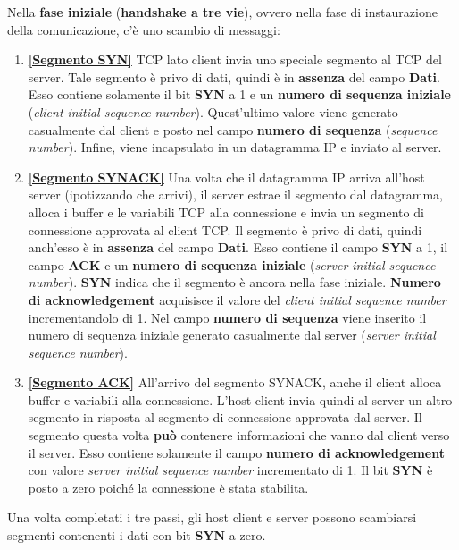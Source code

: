 \documentclass[a4paper]{article}
\begin{document}
	\noindent
	Nella \textcolor{Red3}{\textbf{fase iniziale}} (\textbf{handshake a tre vie}), ovvero nella fase di instaurazione della comunicazione, c’è uno scambio di messaggi:
	\begin{enumerate}
		\item \textbf{\underline{[Segmento SYN]}} TCP lato client invia uno speciale segmento al TCP del server.\newline
		Tale segmento è privo di dati, quindi è in \textbf{assenza} del campo \textbf{Dati}.\newline
		Esso contiene solamente il bit \textbf{SYN} a 1 e un \textbf{numero di sequenza iniziale} (\emph{client initial sequence number}). Quest'ultimo valore viene generato casualmente dal client e posto nel campo \textbf{numero di sequenza} (\emph{sequence number}).\newline
		Infine, viene incapsulato in un datagramma IP e inviato al server.
		
		\item \textbf{\underline{[Segmento SYNACK]}} Una volta che il datagramma IP arriva all’host server (ipotizzando che arrivi), il server estrae il segmento dal datagramma, alloca i buffer e le variabili TCP alla connessione e invia un segmento di connessione approvata al client TCP.\newline
		Il segmento è privo di dati, quindi anch’esso è in \textbf{assenza} del campo \textbf{Dati}.\newline
		Esso contiene il campo \textbf{SYN} a 1, il campo \textbf{ACK} e un \textbf{numero di sequenza iniziale} (\emph{server initial sequence number}).\newline
		\textbf{SYN} indica che il segmento è ancora nella fase iniziale.\newline
		\textbf{Numero di acknowledgement} acquisisce il valore del \emph{client initial sequence number} incrementandolo di 1.\newline
		Nel campo \textbf{numero di sequenza} viene inserito il numero di sequenza iniziale generato casualmente dal server (\emph{server initial sequence number}).
		
		\item \textbf{\underline{[Segmento ACK]}} All’arrivo del segmento SYNACK, anche il client alloca buffer e variabili alla connessione. L’host client invia quindi al server un altro segmento in risposta al segmento di connessione approvata dal server.\newline
		Il segmento questa volta \textbf{può} contenere informazioni che vanno dal client verso il server.\newline
		Esso contiene solamente il campo \textbf{numero di acknowledgement} con valore \emph{server initial sequence number} incrementato di 1.\newline
		Il bit \textbf{SYN} è posto a zero poiché la connessione è stata stabilita.
	\end{enumerate}
	Una volta completati i tre passi, gli host client e server possono scambiarsi segmenti contenenti i dati con bit \textbf{SYN} a zero.
	
\end{document}
